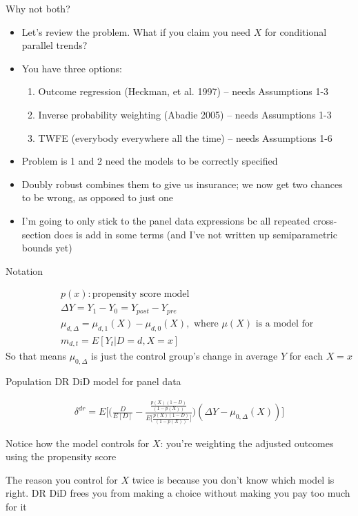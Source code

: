 \documentclass{beamer}
\begin{document}
\begin{frame}{Why not both?}

\begin{itemize}
\item Let's review the problem.  What if you claim you need $X$ for conditional parallel trends?
\item You have three options:
	\begin{enumerate}
	\item Outcome regression (Heckman, et al. 1997) -- needs Assumptions 1-3
	\item Inverse probability weighting (Abadie 2005) -- needs Assumptions 1-3
	\item TWFE (everybody everywhere all the time) -- needs Assumptions 1-6
	\end{enumerate}
\item Problem is 1 and 2 need the models to be correctly specified
\item Doubly robust combines them to give us insurance; we now get two chances to be wrong, as opposed to just one
\item I'm going to only stick to the panel data expressions bc all repeated cross-section does is add in some terms (and I've not written up semiparametric bounds yet)
\end{itemize}

\end{frame}


\begin{frame}{Notation}

\begin{eqnarray*}
&&p(x): \text{propensity score model} \\
&& \Delta Y = Y_1 - Y_0 = Y_{post} - Y_{pre} \\
&& \mu_{d,\Delta} = \mu_{d,1}(X) - \mu_{d,0}(X), \text{ where } \mu(X) \text{ is a model for} \\
&& m_{d,t} = E[Y_t|D=d,X=x]
\end{eqnarray*}So that means $\mu_{0,\Delta}$ is just the control group's change in average $Y$ for each $X=x$

\end{frame}

\begin{frame}{Population DR DiD model for panel data}

\begin{eqnarray*}
\delta^{dr} = E \bigg [ \bigg ( \frac{D}{E[D]} -\frac{ \frac{p(X)(1-D)}{(1-p(X))} }{E \bigg [\frac{p(X)(1-D)}{(1-p(X))} \bigg ]} \bigg  )( \Delta Y - \mu_{0,\Delta}(X)) \bigg ]
\end{eqnarray*}

Notice how the model controls for $X$: you're weighting the adjusted outcomes using the propensity score

\bigskip

The reason you control for $X$ twice is because you don't know which model is right.  DR DiD frees you from making a choice without making you pay too much for it


\end{frame}
\end{document}
